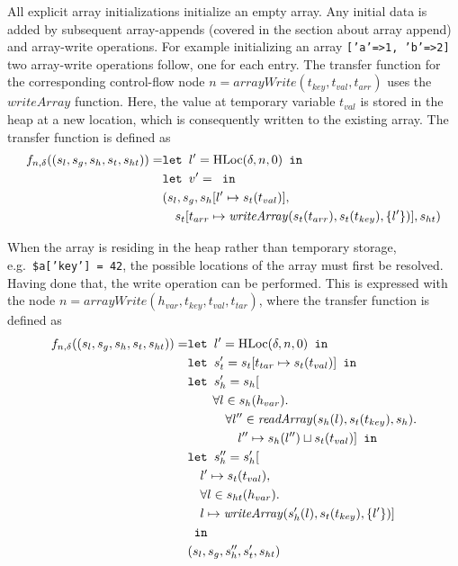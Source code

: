 All explicit array initializations initialize an empty array. Any initial data is added by subsequent array-appends (covered in the section about array append) and array-write operations. For example initializing an array \texttt{['a'=>1, 'b'=>2]} two array-write operations follow, one for each entry. The transfer function for the corresponding control-flow node $n = \mathit{arrayWrite}(t_{key},t_{val},t_{arr})$ uses the $\mathit{writeArray}$ function. Here, the value at temporary variable $t_{val}$ is stored in the heap at a new location, which is consequently written to the existing array. The transfer function is defined as
\begin{align}
f_{n,\delta}((s_l, s_g, s_h, s_t, s_{ht})) = & \texttt{let } l' = \text{HLoc}(\delta, n, 0) \texttt{ in }\notag\\
                            & \texttt{let } v' =  \texttt{ in }\notag\\
                            &(s_l, s_g, s_h[l'\mapsto s_t(t_{val})], \notag\\
                            &\quad s_t[t_{arr} \mapsto \mathit{writeArray}(s_t(t_{arr}), s_t(t_{key}), \{l'\})], s_{ht})
\end{align}

When the array is residing in the heap rather than temporary storage, e.g.\ \texttt{\$a['key'] = 42}, the possible locations of the array must first be resolved. Having done that, the write operation can be performed. This is expressed with the node $n = \mathit{arrayWrite}(h_{var}, t_{key},t_{val},t_{tar})$, where the transfer function is defined as
\begin{align}
f_{n,\delta}((s_l, s_g, s_h, s_t, s_{ht})) = &\texttt{let } l' = \text{HLoc}(\delta, n, 0) \texttt{ in } \notag\\
                            &\texttt{let } s_t' = s_t[t_{tar}\mapsto s_t(t_{val})] \texttt{ in }\notag\\
                            &\texttt{let } s_h' =  s_h[\notag\\
                            &\quad\quad\forall l \in s_h(h_{var}).\notag\\
                            &\quad\quad\quad\forall l'' \in \mathit{readArray}(s_h(l), s_t(t_{key}), s_h).\notag\\
                            &\quad\quad\quad\quad l''\mapsto s_h(l'') \sqcup s_t(t_{val})] \texttt{ in }\notag\\
                            &\texttt{let } s_h'' = s_h'[\notag\\
                            &\quad l' \mapsto s_t(t_{val}), \notag\\
                            &\quad \forall l \in s_{ht}(h_{var}).\notag\\
                            &\quad l\mapsto \mathit{writeArray}(s_h'(l), s_t(t_{key}), \{l'\})]\notag\\
                            & \texttt{ in }\notag\\
                            &(s_l, s_g, s_h'', s_t', s_{ht})
\end{align}

